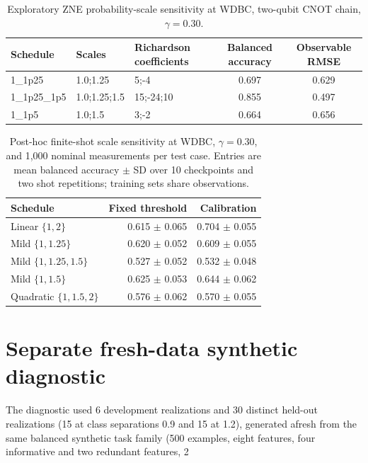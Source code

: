 \documentclass[10pt]{article}
\begin{document}
\begin{table}[t]\centering\scriptsize
\caption{Exploratory ZNE probability-scale sensitivity at WDBC, two-qubit CNOT chain, $\gamma=0.30$.}
\label{tab:scales}
\begin{tabular}{@{}l l l c c@{}}\toprule
Schedule & Scales & Richardson coefficients & Balanced accuracy & Observable RMSE \\
\midrule
1\_1p25 & 1.0;1.25 & 5;-4 & 0.697 & 0.629 \\
1\_1p25\_1p5 & 1.0;1.25;1.5 & 15;-24;10 & 0.855 & 0.497 \\
1\_1p5 & 1.0;1.5 & 3;-2 & 0.664 & 0.656 \\
\bottomrule\end{tabular}\end{table}

\begin{table}[t]\centering\small
\caption{Post-hoc finite-shot scale sensitivity at WDBC, $\gamma=0.30$, and 1,000 nominal measurements per test case. Entries are mean balanced accuracy $\pm$ SD over 10 checkpoints and two shot repetitions; training sets share observations.}
\label{tab:finite-scales}
\begin{tabular}{@{}l r r@{}}\toprule
Schedule & Fixed threshold & Calibration \\
\midrule
Linear $\{1,2\}$ & 0.615 $\pm$ 0.065 & 0.704 $\pm$ 0.055 \\
Mild $\{1,1.25\}$ & 0.620 $\pm$ 0.052 & 0.609 $\pm$ 0.055 \\
Mild $\{1,1.25,1.5\}$ & 0.527 $\pm$ 0.052 & 0.532 $\pm$ 0.048 \\
Mild $\{1,1.5\}$ & 0.625 $\pm$ 0.053 & 0.644 $\pm$ 0.062 \\
Quadratic $\{1,1.5,2\}$ & 0.576 $\pm$ 0.062 & 0.570 $\pm$ 0.055 \\
\bottomrule\end{tabular}\end{table}

\clearpage
\section*{Separate fresh-data synthetic diagnostic}

The diagnostic used 6 development realizations and 30 distinct held-out realizations (15 at class separations 0.9 and 15 at 1.2), generated afresh from the same balanced synthetic task family (500 examples, eight features, four informative and two redundant features, 2%
\end{document}
